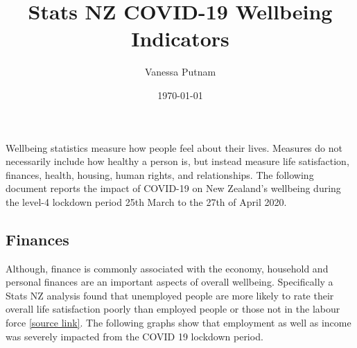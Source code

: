 \documentclass{article}
\title{Stats NZ COVID-19 Wellbeing Indicators }
\author{Vanessa Putnam}
\date{\today}
\begin{document}
\maketitle

Wellbeing statistics measure how people feel about their lives. Measures do not necessarily include how healthy a person is, but instead measure life satisfaction, finances, health, housing, human rights, and relationships. The following document reports the impact of COVID-19 on New Zealand's wellbeing during the level-4 lockdown period 25th March to the 27th of April 2020.

\subsection*{Finances}
Although, finance is commonly associated with the economy, household and personal finances are an important aspects of overall wellbeing. Specifically a Stats NZ analysis found that unemployed people are more likely to rate their overall life satisfaction poorly than employed people or those not in the labour force \href{https://www.stats.govt.nz/news/unemployed-people-less-satisfied-with-life}{[source link]}. The following graphs show that employment as well as income was severely impacted from the COVID 19 lockdown period. 
\end{document}
